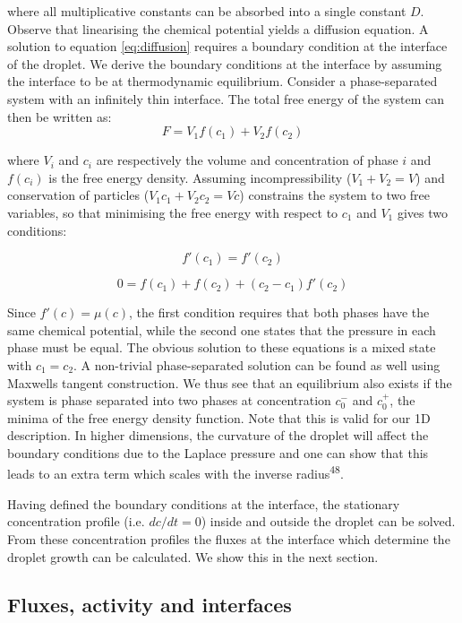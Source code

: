 \documentclass{Dissertate}
\begin{document}
where all multiplicative constants can be absorbed into a single constant $D$. Observe that linearising the chemical potential yields a diffusion equation. A solution to equation \ref{eq:diffusion} requires a boundary condition at the interface of the droplet. We derive the boundary conditions at the interface by assuming the interface to be at thermodynamic equilibrium. Consider a phase-separated system with an infinitely thin interface. The total free
energy of the system can then be written as: \[
F = V_1 f(c_1) + V_2 f(c_2)
\]

where \(V_i\) and \(c_i\) are respectively the volume and
concentration of phase \(i\) and \(f(c_i)\) is the free energy
density. Assuming incompressibility (\(V_1+V_2=V\)) and conservation of
particles (\(V_1c_1+V_2c_2=Vc\)) constrains the system to two
free variables, so that minimising the free energy with respect to
\(c_1\) and \(V_1\) gives two conditions:

\[
f'(c_1) = f'(c_2)
\]

\[
0 = f(c_1) + f(c_2) + (c_2-c_1)f'(c_2)
\]

Since \(f'(c) = \mu(c)\), the first condition requires that both
phases have the same chemical potential, while the second one
states that the pressure in each phase must be equal. The obvious solution
to these equations is a mixed state with \(c_1=c_2\). A
non-trivial phase-separated solution can be found as well using Maxwells tangent construction. We thus see that an equilibrium also exists if the system is phase separated into two phases at concentration $c_0^-$ and $c_0^+$, the minima of the free energy density function. Note that this is valid for our 1D description. In higher dimensions, the curvature of the droplet will affect the boundary conditions due to the Laplace pressure and one can show that this leads to an extra term which scales with the inverse radius\textsuperscript{48}.

Having defined the boundary conditions at the interface, the stationary concentration profile (i.e. $dc/dt=0$) inside and outside the droplet can be solved. From these concentration profiles the fluxes at the interface which determine the droplet growth can be calculated. We show this in the next section.

\newpage
\hypertarget{fluxes-activity-and-interfaces}{%
\subsection{Fluxes, activity and
interfaces}\label{fluxes-activity-and-interfaces}}
\end{document}
